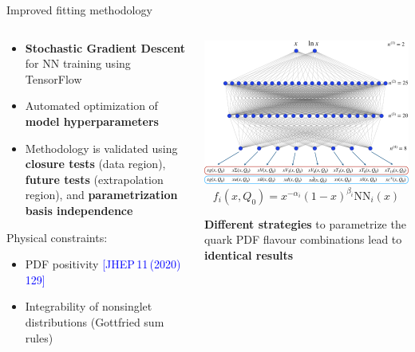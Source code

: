 \documentclass[aspectratio=169,9pt]{beamer}
\begin{document}
\begin{frame}[t]{Improved fitting methodology}
    \begin{columns}[T]
        \begin{column}{0.48\textwidth}
            \begin{itemize}
                \item \textbf{Stochastic Gradient Descent} for NN training using TensorFlow
                \item Automated optimization of \\ \textbf{ model hyperparameters}
                \item Methodology is validated using 
                {\bf closure tests} (data region), {\bf future tests} (extrapolation region), and {\bf parametrization basis independence}
            \end{itemize}
        \vspace*{1em}
        Physical constraints:
        \begin{itemize}
            \item PDF positivity {\footnotesize{{\textcolor{blue}{[JHEP\,11\,(2020)\,129]}}}}
            \item Integrability of nonsinglet distributions (Gottfried sum rules)
        \end{itemize}
        \end{column}
        \begin{column}{0.48\textwidth}
            \vspace*{-3em}
            \includegraphics[width=1.0\textwidth]{NNarch}
            \begin{equation*}
                f_{i}\left(x, Q_{0}\right)=x^{-\alpha_{i}}(1-x)^{\beta_{i}} \mathrm{NN}_{i}(x)
            \end{equation*}
            \vspace*{-1em}
            \begin{block}{}
                \textbf{Different strategies} to parametrize the quark PDF flavour combinations lead to \textbf{identical results}
            \end{block}
        \end{column}
    \end{columns}
\end{frame}
\end{document}
